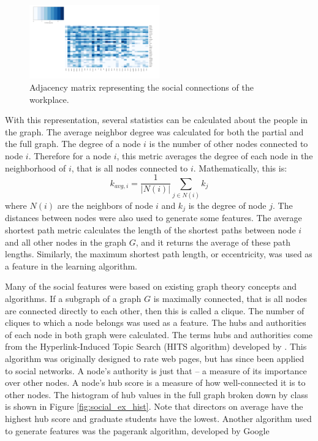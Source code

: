 \documentclass{article}
\begin{document}
\begin{figure}[H]
    \centering
        \includegraphics[width=0.5\textwidth]{adj_matrix}
        \caption{Adjacency matrix representing the social connections of the workplace.}
        \label{fig:adj_matrix}
\end{figure}

With this representation, several statistics can be calculated about the people in the graph.  The average neighbor degree was calculated for both the partial and the full graph.  The degree of a node $i$ is the number of other nodes connected to node $i$.  Therefore for a node $i$, this metric averages the degree of each node in the neighborhood of $i$, that is all nodes connected to $i$.  Mathematically, this is:
\begin{equation}
k_{avg,i} = \frac{1}{|N(i)|}\sum_{j \in N(i)}k_j
\end{equation}
where $N(i)$ are the neighbors of node $i$ and $k_j$ is the degree of node $j$.
The distances between nodes were also used to generate some features.  The average shortest path metric calculates the length of the shortest paths between node $i$ and all other nodes in the graph $G$, and it returns the average of these path lengths.  Similarly, the maximum shortest path length, or eccentricity, was used as a feature in the learning algorithm.  
\par
Many of the social features were based on existing graph theory concepts and algorithms. If a subgraph of a graph $G$ is maximally connected, that is all nodes are connected directly to each other, then this is called a clique.  The number of cliques to which a node belongs was used as a feature.  The hubs and authorities of each node in both graph were calculated.  The terms hubs and authorities come from the Hyperlink-Induced Topic Search (HITS algorithm) developed by \cite{kleinberg_hubs_1999}.  This algorithm was originally designed to rate web pages, but has since been applied to social networks. A node's authority is just that -- a measure of its importance over other nodes.  A node's hub score is a measure of how well-connected it is to other nodes.  The histogram of hub values in the full graph broken down by class is shown in Figure \ref{fig:social_ex_hist}.  Note that directors on average have the highest hub score and graduate students have the lowest. Another algorithm used to generate features was the pagerank algorithm, developed by Google 
\end{document}
